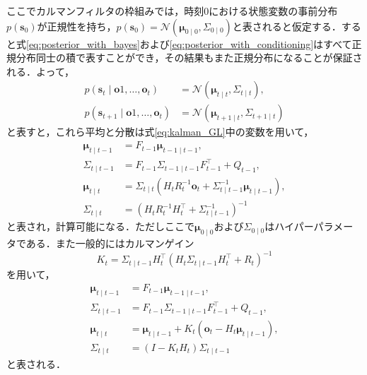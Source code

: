         ここでカルマンフィルタの枠組みでは，時刻$0$における状態変数の事前分布$p(\bm{s}_0)$が正規性を持ち，$p(\bm{s}_0) = \mathcal{N}(\bm{\mu}_{0 \mid 0}, \Sigma_{0 \mid 0})$と表されると仮定する．すると式\ref{eq:posterior_with_bayes}および\ref{eq:posterior_with_conditioning}はすべて正規分布同士の積で表すことができ，その結果もまた正規分布になることが保証される．よって，
        \begin{equation}
            \label{eq:normal_dist_representation}
            \begin{aligned}
                p(\bm{s}_t \mid \bm{o}1, \dots, \bm{o}_t)& = \mathcal{N}\left(\bm{\mu}_{t \mid t}, \Sigma_{t \mid t}\right),
                \\ p(\bm{s}_{t+1} \mid \bm{o}1, \dots, \bm{o}_t) &= \mathcal{N}\left(\bm{\mu}_{t+1 \mid t}, \Sigma_{t+1 \mid t}\right)
            \end{aligned}
        \end{equation}
        と表すと，これら平均と分散は式\ref{eq:kalman_GL}中の変数を用いて，
        \begin{equation}
            \label{eq:estimation_equations}
            \begin{aligned}
                \bm{\mu}_{t \mid t-1} &= F_{t-1} \bm{\mu}_{t-1 \mid t-1},
                \\\Sigma_{t \mid t-1} &= F_{t-1} \Sigma_{t-1 \mid t-1} F_{t-1}^{\top} + Q_{t-1},
                \\\bm{\mu}_{t \mid t} &= \Sigma_{t \mid t} \left( H_t R_t^{-1} \bm{o}_t + \Sigma_{t \mid t-1}^{-1} \bm{\mu}_{t \mid t-1} \right),
                \\\Sigma_{t \mid t} &= \left( H_t R_t^{-1} H_t^{\top} + \Sigma_{t \mid t-1}^{-1}\right)^{-1}
            \end{aligned}
        \end{equation}
        と表され，計算可能になる．ただしここで$\bm{\mu}_{0 \mid 0}$および$\Sigma_{0 \mid 0}$はハイパーパラメータである．また一般的にはカルマンゲイン
        \begin{equation}
            \label{eq:kalman_gain}
            K_t = \Sigma_{t \mid t-1} H_t^{\top} \left(H_t \Sigma_{t \mid t-1} H_t^{\top} + R_t\right)^{-1}
        \end{equation}
        を用いて，
        \begin{equation}
            \label{eq:estimation_equations_with_K}
            \begin{aligned}
                \bm{\mu}_{t \mid t-1} &= F_{t-1} \bm{\mu}_{t-1 \mid t-1},
                \\\Sigma_{t \mid t-1} &= F_{t-1} \Sigma_{t-1 \mid t-1} F_{t-1}^{\top} + Q_{t-1},
                \\\bm{\mu}_{t \mid t} &= \bm{\mu}_{t \mid t-1} + K_t \left(\bm{o}_t - H_t \bm{\mu}_{t \mid t-1}\right),
                \\\Sigma_{t \mid t} &= (I - K_t H_t) \Sigma_{t \mid t-1}
            \end{aligned}                    
        \end{equation}
        と表される．

